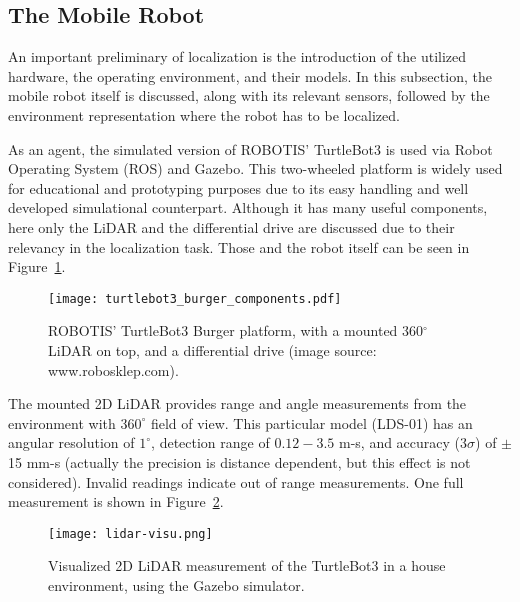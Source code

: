 \subsection{The Mobile Robot}
An important preliminary of localization is the introduction of the utilized hardware, the operating environment,
and their models.
In this subsection, the mobile robot itself is discussed, along with its relevant sensors,
followed by the environment representation where the robot has to be localized.

As an agent, the simulated version of ROBOTIS' TurtleBot3 is used via Robot Operating System (ROS) and Gazebo.
This two-wheeled platform is widely used for educational and prototyping purposes due to its easy handling
and well developed simulational counterpart. Although it has many useful components, here only the LiDAR and the
differential drive are discussed due to their relevancy in the localization task.
Those and the robot itself can be seen in Figure~\ref{fig:turtlebot3-burger}.
\begin{figure}[htbp]
    \centering
    \texttt{[image: turtlebot3\_burger\_components.pdf]}
    \caption[]{ROBOTIS' TurtleBot3 Burger platform, with a mounted 360$^\circ$ LiDAR on top, and a differential drive (image source: www.robosklep.com).}
    \label{fig:turtlebot3-burger}
\end{figure}
The mounted 2D LiDAR provides range and angle measurements from the environment with $360^\circ$ field of view.
This particular model (LDS-01) has an angular resolution of $1^\circ$, detection range of $0.12-3.5$ m-s, %
and accuracy (3$\sigma$) of $\pm$15 mm-s (actually the precision is distance dependent, but this effect is not considered).
Invalid readings indicate out of range measurements. One full measurement is shown in Figure~\ref{fig:lidar-readings}.
\begin{figure}[htbp]
    \centering
    \texttt{[image: lidar-visu.png]}
    \caption{Visualized 2D LiDAR measurement of the TurtleBot3 in a house environment, using the Gazebo simulator.}
    \label{fig:lidar-readings}
\end{figure}

